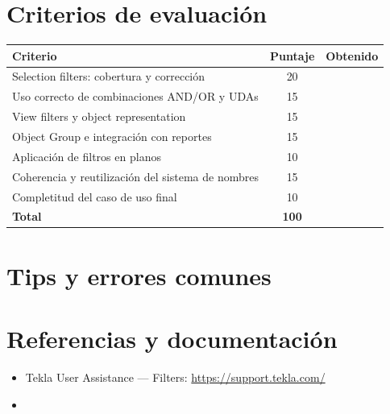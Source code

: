\documentclass[11pt,a4paper]{article}
\begin{document}
\section{Criterios de evaluación}
\begin{table}[H]
\centering
\begin{tabularx}{\textwidth}{Xcc}
\toprule
\textbf{Criterio} & \textbf{Puntaje} & \textbf{Obtenido} \\
\midrule
Selection filters: cobertura y corrección & 20 & \\
Uso correcto de combinaciones AND/OR y UDAs & 15 & \\
View filters y object representation & 15 & \\
Object Group e integración con reportes & 15 & \\
Aplicación de filtros en planos & 10 & \\
Coherencia y reutilización del sistema de nombres & 15 & \\
Completitud del caso de uso final & 10 & \\
\midrule
\textbf{Total} & \textbf{100} & \\
\bottomrule
\end{tabularx}
\end{table}

\section{Tips y errores comunes}
\begin{tip}
\end{tip}

\begin{advertencia}
\end{advertencia}

\section{Referencias y documentación}
\begin{itemize}
    \item Tekla User Assistance — Filters: \url{https://support.tekla.com/}
    \item [Otras referencias]
\end{itemize}
\end{document}

